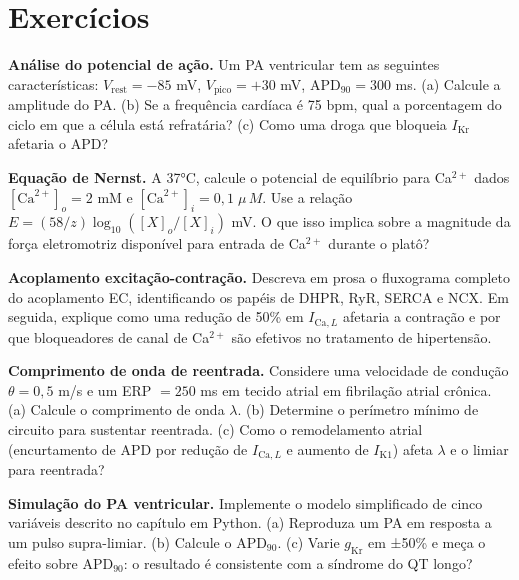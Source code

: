 \section{Exercícios}
\label{sec:12-exercicios}

\begin{exercicio}
\textbf{Análise do potencial de ação.} Um PA ventricular tem as seguintes
características: $V_{\mathrm{rest}} = -85$ mV, $V_{\mathrm{pico}} = +30$ mV,
$\mathrm{APD}_{90} = 300$ ms. (a) Calcule a amplitude do PA. (b) Se a
frequência cardíaca é 75 bpm, qual a porcentagem do ciclo em que a célula
está refratária? (c) Como uma droga que bloqueia $I_{\mathrm{Kr}}$ afetaria
o APD?
\end{exercicio}

\begin{exercicio}
\textbf{Equação de Nernst.} A 37°C, calcule o potencial de equilíbrio para
Ca$^{2+}$ dados $[\mathrm{Ca}^{2+}]_o = 2$ mM e $[\mathrm{Ca}^{2+}]_i = 0{,}1\;\mu\,M$.
Use a relação $E = (58/z) \log_{10}([X]_o/[X]_i)$ mV. O que isso implica
sobre a magnitude da força eletromotriz disponível para entrada de
Ca$^{2+}$ durante o platô?
\end{exercicio}

\begin{exercicio}
\textbf{Acoplamento excitação-contração.} Descreva em prosa o fluxograma
completo do acoplamento EC, identificando os papéis de DHPR, RyR, SERCA
e NCX. Em seguida, explique como uma redução de 50\% em $I_{\mathrm{Ca},L}$
afetaria a contração e por que bloqueadores de canal de Ca$^{2+}$
são efetivos no tratamento de hipertensão.
\end{exercicio}

\begin{exercicio}
\textbf{Comprimento de onda de reentrada.} Considere uma velocidade de
condução $\theta = 0{,}5$ m/s e um ERP $= 250$ ms em tecido atrial
em fibrilação atrial crônica. (a) Calcule o comprimento de onda
$\lambda$. (b) Determine o perímetro mínimo de circuito para sustentar
reentrada. (c) Como o remodelamento atrial (encurtamento de APD por
redução de $I_{\mathrm{Ca},L}$ e aumento de $I_{\mathrm{K1}}$) afeta
$\lambda$ e o limiar para reentrada?
\end{exercicio}

\begin{exercicio}
\textbf{Simulação do PA ventricular.} Implemente o modelo simplificado de
cinco variáveis descrito no capítulo em Python. (a) Reproduza um PA em
resposta a um pulso supra-limiar. (b) Calcule o APD$_{90}$. (c) Varie
$g_{\mathrm{Kr}}$ em ±50\% e meça o efeito sobre APD$_{90}$: o resultado
é consistente com a síndrome do QT longo?
\end{exercicio}

